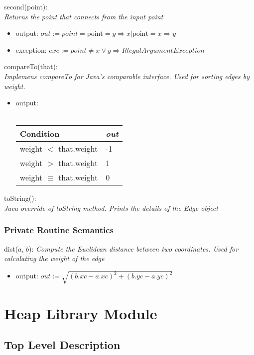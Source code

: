 \documentclass[12pt]{article}
\begin{document}
\noindent
second(point):\\
\textit{Returns the point that connects from the input point}
\begin{itemize}
\item output: $out := point = \mbox{point} = y \Rightarrow x | \mbox{point} = x \Rightarrow y$
\item exception: $exc := point \neq x \lor y \Rightarrow IllegalArgumentException$
\end{itemize}

\noindent
compareTo(that):\\
\textit{Implemens compareTo for Java's comparable interface. Used for sorting edges by weight.}
\begin{itemize}
\item output: \\\\
\begin{tabular}{| l | l |}
\hline
\textbf{Condition} & \textit{out}\\
\hline
weight $<$ that.weight & -1 \\
\hline
weight $>$ that.weight & 1 \\
\hline
weight $\equiv$ that.weight & 0 \\
\hline
\end{tabular}
\end{itemize}

\noindent
toString():\\
\textit{Java override of toString method. Prints the details of the Edge object}

\subsubsection* {Private Routine Semantics}
dist($a$, $b$):
\textit{Compute the Euclidean distance between two coordinates. Used for calculating the weight
of the edge}
\begin{itemize}
\item output: $out := \sqrt{(b.xc-a.xc)^{2} + (b.yc-a.yc)^{2}}$
\end{itemize}

\newpage

\section*{Heap Library Module}

\subsection* {Top Level Description}
\end{document}
